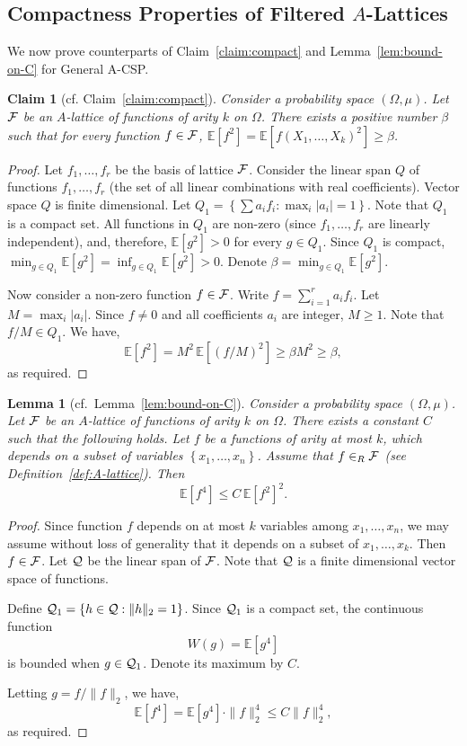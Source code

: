 \documentclass[11pt]{article}
\newcommand {\set}   [1] {\left\{ #1 \right\}}
\newcommand {\Exp}       {\mathbb{E}}
\newcommand {\E}     [1] {\Exp\left[#1\right]}
\newcommand {\calQ}  {{\cal{Q}}}
\newcommand {\calF}   {{\cal{F}}}
\newtheorem{lemma}[theorem]{Lemma}
\newtheorem{claim}[theorem]{Claim}
\begin{document}
\subsection{Compactness Properties of Filtered $A$-Lattices}
We now prove counterparts of Claim~\ref{claim:compact} and Lemma~\ref{lem:bound-on-C} for General A-CSP.
\begin{claim}[cf. Claim~\ref{claim:compact}]\label{claim:compact-A-CSP}
Consider a probability space $(\Omega,\mu)$. Let $\calF$ be an $A$-lattice of functions of arity $k$ on $\Omega$.
There exists a positive number $\beta$ such that for every function $f\in\calF$, $\E{f^2}=\E{f(X_1,\dots, X_k)^2} \geq \beta$.
\end{claim}
\begin{proof}
Let $f_1,\dots,f_r$ be the basis of lattice $\calF$. Consider the linear span $Q$ of functions $f_1,\dots, f_r$ (the set of all linear combinations with real coefficients).
Vector space $Q$ is finite dimensional. Let $Q_1 = \set{\sum a_i f_i: \max_i |a_i| = 1}$. Note that $Q_1$ is a compact set. All functions in $Q_1$ are non-zero (since
$f_1,\dots, f_r$ are linearly independent),
and, therefore, $\E{g^2} > 0$ for every $g\in Q_1$. Since $Q_1$ is compact,  $\min_{g\in Q_1} \E{g^2} = \inf_{g\in Q_1} \E{g^2} > 0$. Denote $\beta = \min_{g\in Q_1} \E{g^2}$.

Now consider a non-zero function $f\in\calF$. Write $f = \sum_{i=1}^r a_i f_i$. Let $M = \max_i |a_i|$. Since $f \neq 0$ and all coefficients $a_i$ are integer, $M \geq 1$.
Note that $f/M \in Q_1$. We have,
$$\E{f^2} = M^2\, \E{(f/M)^2} \geq \beta M^2 \geq \beta,$$
as required.
\end{proof}

\begin{lemma}[cf.~Lemma~\ref{lem:bound-on-C}]\label{lem:bound-on-C-A-CSP}
Consider a probability space $(\Omega,\mu)$. Let  $\calF$ be an $A$-lattice of functions of arity $k$ on $\Omega$.
There exists a constant $C$ such that the following holds. Let $f$ be a functions of arity at most $k$, which
depends on a subset of variables $\set{x_1,\dots, x_n}$. Assume that $f\in_R \calF$ (see Definition~\ref{def:A-lattice}). Then
$$\E{f^4} \leq C\,  \E{f^2}^{2}.$$
\end{lemma}
\begin{proof}
Since function $f$ depends on at most $k$ variables among $x_1,\dots, x_n$, we may assume without loss of generality
that it depends on a subset of $x_1,\dots, x_{k}$. Then $f\in \calF$.
Let $\calQ$ be the linear span of $\calF$.
Note that $\calQ$ is a finite dimensional vector space of functions.

Define $\calQ_1 =\set{h \in \calQ: \|h\|_2 = 1}$. Since $\calQ_1$ is
a compact set, the continuous
function
$$W(g) = \E{g^4}$$
is  bounded when $g \in\calQ_1$. Denote its maximum by $C$.

Letting $g = f / \|f\|_2$, we have,
$$\E{f^4} =
\E{g^4} \cdot \|f\|_2^4
 \leq C  \|f\|_2^4,$$
as required.
\end{proof}
\end{document}
